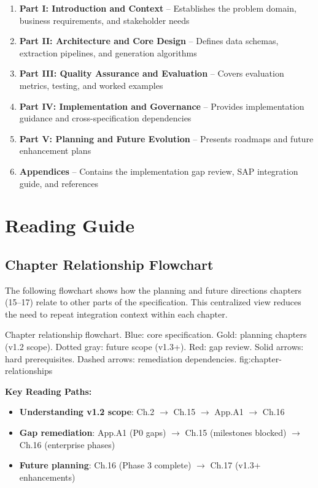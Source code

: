 \begin{enumerate}
    \item \textbf{Part I: Introduction and Context} -- Establishes the problem domain, business requirements, and stakeholder needs
    \item \textbf{Part II: Architecture and Core Design} -- Defines data schemas, extraction pipelines, and generation algorithms
    \item \textbf{Part III: Quality Assurance and Evaluation} -- Covers evaluation metrics, testing, and worked examples
    \item \textbf{Part IV: Implementation and Governance} -- Provides implementation guidance and cross-specification dependencies
    \item \textbf{Part V: Planning and Future Evolution} -- Presents roadmaps and future enhancement plans
    \item \textbf{Appendices} -- Contains the implementation gap review, SAP integration guide, and references
\end{enumerate}

\section*{Reading Guide}

\subsection*{Chapter Relationship Flowchart}

The following flowchart shows how the planning and future directions chapters (15--17) relate to other parts of the specification. This centralized view reduces the need to repeat integration context within each chapter.

%
  {Chapter relationship flowchart. Blue: core specification. Gold: planning
    chapters (v1.2 scope). Dotted gray: future scope (v1.3+). Red: gap review.
    Solid arrows: hard prerequisites. Dashed arrows: remediation dependencies.}%
  {fig:chapter-relationships}

\noindent
\textbf{Key Reading Paths:}
\begin{itemize}
  \item \textbf{Understanding v1.2 scope}: Ch.2 $\to$ Ch.15 $\to$ App.A1 $\to$ Ch.16
  \item \textbf{Gap remediation}: App.A1 (P0 gaps) $\to$ Ch.15 (milestones blocked) $\to$ Ch.16 (enterprise phases)
  \item \textbf{Future planning}: Ch.16 (Phase 3 complete) $\to$ Ch.17 (v1.3+ enhancements)
\end{itemize}

